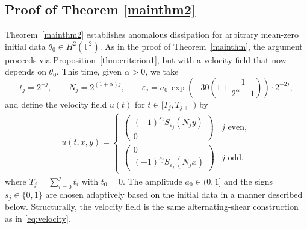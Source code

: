 \documentclass[12pt]{report}   %
\numberwithin{equation}{section}
\theoremstyle{plain}
\theoremstyle{definition}
\theoremstyle{remark}
\newcommand{\eps}{{\varepsilon}}
\begin{document}
 

\subsection{Proof of Theorem \ref{mainthm2}}

Theorem~\ref{mainthm2} establishes anomalous dissipation for arbitrary mean-zero initial data $\theta_0 \in H^2(\mathbb{T}^2)$. As in the proof of Theorem~\ref{mainthm}, the argument proceeds via Proposition~\ref{thm:criterion1}, but with a velocity field that now depends on $\theta_0$. This time, given $\alpha>0$, we take \[t_j=2^{-j},\qquad N_j=2^{{(1+\alpha)}j},\qquad \eps_j= a_0 \, {\exp\left(-30(1 + \frac{1}{2^\alpha-1})\right)}\cdot 2^{-2j},\] and define the velocity field $u(t)$ for $t \in [T_j,T_{j+1})$ by \begin{equation}\label{eq:velocity2}
\begin{split}
u(t, x,y) = \begin{cases}
\begin{pmatrix}
(-1)^{s_j}S_{\eps_j}(N_jy) \\
0
\end{pmatrix}  & j \mbox{ even},  \\
\begin{pmatrix}
0 \\
(-1)^{s_j}S_{\eps_j}(N_jx) 
\end{pmatrix} & j \mbox{ odd, }
\end{cases} 
\end{split}
\end{equation} where $T_j = \sum_{i=0}^j t_i$ with $t_0 = 0$. The amplitude $a_0 \in (0,1]$ and the signs $s_j \in \{0,1\}$ are chosen adaptively based on the initial data in a manner described below. Structurally, the velocity field is the same alternating-shear construction as in \eqref{eq:velocity}.
\end{document}
